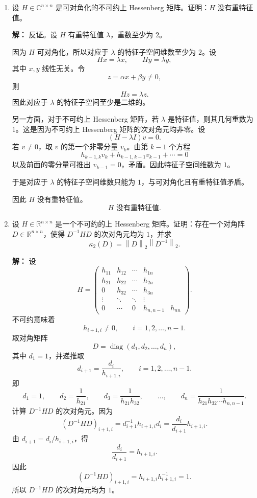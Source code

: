 \documentclass[11pt]{article}
\newcommand{\R}{\mathbb{R}}
\newcommand{\C}{\mathbb{C}}
\newcommand{\diag}{\operatorname{diag}}
\newcommand{\norm}[1]{\left\lVert #1 \right\rVert}
\newenvironment{solution}{\par\noindent\textbf{解：}}{\par}
\begin{document}
\begin{enumerate}
\item 设 \(H\in\C^{n\times n}\) 是可对角化的不可约上 Hessenberg 矩阵。证明：\(H\) 没有重特征值。

\begin{solution}
反证。设 \(H\) 有重特征值 \(\lambda\)，重数至少为 \(2\)。

因为 \(H\) 可对角化，所以对应于 \(\lambda\) 的特征子空间维数至少为 \(2\)。设
\[
Hx=\lambda x,\qquad Hy=\lambda y,
\]
其中 \(x,y\) 线性无关。令
\[
z=\alpha x+\beta y\neq 0,
\]
则
\[
Hz=\lambda z.
\]
因此对应于 \(\lambda\) 的特征子空间至少是二维的。

另一方面，对于不可约上 Hessenberg 矩阵，若 \(\lambda\) 是特征值，则其几何重数为 \(1\)。这是因为不可约上 Hessenberg 矩阵的次对角元均非零。设
\[
(H-\lambda I)v=0.
\]
若 \(v\neq 0\)，取 \(v\) 的第一个非零分量 \(v_k\)。由第 \(k-1\) 个方程
\[
h_{k-1,k}v_k+h_{k-1,k-1}v_{k-1}+\cdots=0
\]
以及前面的零分量可推出 \(v_{k-1}=0\)，矛盾。因此特征子空间维数为 \(1\)。

于是对应于 \(\lambda\) 的特征子空间维数只能为 \(1\)，与可对角化且有重特征值矛盾。

因此 \(H\) 没有重特征值。
\[
\boxed{H\text{ 没有重特征值}.}
\]
\end{solution}

\item 设 \(H\in\R^{n\times n}\) 是一个不可约的上 Hessenberg 矩阵。证明：存在一个对角阵
\(D\in\R^{n\times n}\)，使得 \(D^{-1}HD\) 的次对角元均为 \(1\)，并求
\[
\kappa_2(D)=\norm{D}_2\norm{D^{-1}}_2.
\]

\begin{solution}
设
\[
H=
\begin{pmatrix}
h_{11}&h_{12}&\cdots&h_{1n}\\
h_{21}&h_{22}&\cdots&h_{2n}\\
0&h_{32}&\cdots&h_{3n}\\
\vdots&\ddots&\ddots&\vdots\\
0&\cdots&0&h_{n,n-1}&h_{nn}
\end{pmatrix}.
\]
不可约意味着
\[
h_{i+1,i}\neq 0,\qquad i=1,2,\dots,n-1.
\]
取对角矩阵
\[
D=\diag(d_1,d_2,\dots,d_n),
\]
其中 \(d_1=1\)，并递推取
\[
d_{i+1}=\frac{d_i}{h_{i+1,i}},\qquad i=1,2,\dots,n-1.
\]
即
\[
d_1=1,\qquad
d_2=\frac{1}{h_{21}},\qquad
d_3=\frac{1}{h_{21}h_{32}},\qquad
\dots,\qquad
d_n=\frac{1}{h_{21}h_{32}\cdots h_{n,n-1}}.
\]
计算 \(D^{-1}HD\) 的次对角元。因为
\[
(D^{-1}HD)_{i+1,i}
=
d_{i+1}^{-1}h_{i+1,i}d_i
=
\frac{d_i}{d_{i+1}}h_{i+1,i}.
\]
由 \(d_{i+1}=d_i/h_{i+1,i}\)，得
\[
\frac{d_i}{d_{i+1}}=h_{i+1,i}.
\]
因此
\[
(D^{-1}HD)_{i+1,i}=h_{i+1,i}h_{i+1,i}^{-1}=1.
\]
所以 \(D^{-1}HD\) 的次对角元均为 \(1\)。


\end{solution}
\end{enumerate}
\end{document}
